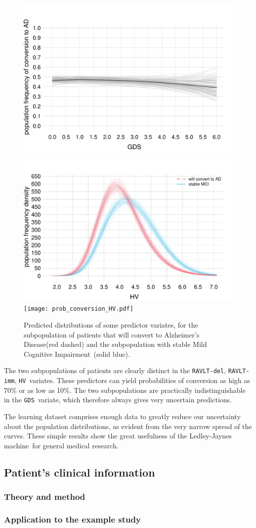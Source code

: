\documentclass[utf8]{FrontiersinHarvard} %
\renewcommand*{\|}[1][]{\nonscript\:#1\vert\nonscript\:\mathopen{}}
\newcommand*{\hv}{\texttt{HV}}
\newcommand*{\gds}{\texttt{GDS}}
\newcommand*{\ravltimm}{\texttt{RAVLT-imm}}
\newcommand*{\ravltdel}{\texttt{RAVLT-del}}
\newcommand*{\ad}{Alzheimer's Disease}
\newcommand*{\mci}{Mild Cognitive Impairment}
\newcommand*{\ljm}{Ledley-Jaynes machine}
\begin{document}
\begin{figure}[!t]
\qquad%
\includegraphics[width=0.43\linewidth]{prob_conversion_GDS.pdf}%
\\
\includegraphics[width=0.43\linewidth]{population_distr_HV.pdf}%
\qquad%
\texttt{[image: prob\_conversion\_HV.pdf]}%
\caption{Predicted distributions of some predictor variates, for the subpopulation of patients that will convert to \ad (red dashed) and the subpopulation with stable \mci\ (solid blue).}\label{fig:marginal_pop_distributions}
\end{figure}%
%
The two subpopulations of patients are clearly distinct in the \ravltdel, \ravltimm, \hv\ variates. These predictors can yield probabilities of conversion as high as 70\% or as low as 10\%. The two subpopulations are practically indistinguishable in the \gds\ variate, which therefore always gives very uncertain predictions.

The learning dataset comprises enough data to greatly reduce our uncertainty about the population distributions, as evident from the very narrow spread of the curves. These simple results show the great usefulness of the \ljm\ for general medical research.


\subsection{Patient's clinical information}
\label{sec:predictor_step}

\subsubsection{Theory and method}
\label{sec:predictor_theory}


\subsubsection{Application to the example study}
\label{sec:learn_application}
\end{document}

